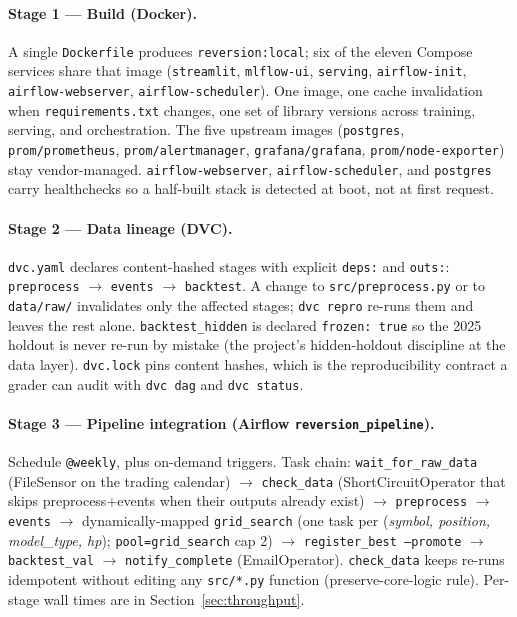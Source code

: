 \documentclass[11pt,a4paper]{article}
\begin{document}
\paragraph{Stage 1 --- Build (Docker).}
A single \texttt{Dockerfile} produces \texttt{reversion:local}; six of the eleven Compose services share that image (\texttt{streamlit}, \texttt{mlflow-ui}, \texttt{serving}, \texttt{airflow-init}, \texttt{airflow-webserver}, \texttt{airflow-scheduler}). One image, one cache invalidation when \texttt{requirements.txt} changes, one set of library versions across training, serving, and orchestration. The five upstream images (\texttt{postgres}, \texttt{prom/prometheus}, \texttt{prom/alertmanager}, \texttt{grafana/grafana}, \texttt{prom/node-exporter}) stay vendor-managed. \texttt{airflow-webserver}, \texttt{airflow-scheduler}, and \texttt{postgres} carry healthchecks so a half-built stack is detected at boot, not at first request.

\paragraph{Stage 2 --- Data lineage (DVC).}
\texttt{dvc.yaml} declares content-hashed stages with explicit \texttt{deps:} and \texttt{outs:}: \texttt{preprocess} $\to$ \texttt{events} $\to$ \texttt{backtest}. A change to \texttt{src/preprocess.py} or to \texttt{data/raw/} invalidates only the affected stages; \texttt{dvc repro} re-runs them and leaves the rest alone. \texttt{backtest\_hidden} is declared \texttt{frozen: true} so the 2025 holdout is never re-run by mistake (the project's hidden-holdout discipline at the data layer). \texttt{dvc.lock} pins content hashes, which is the reproducibility contract a grader can audit with \texttt{dvc dag} and \texttt{dvc status}.

\paragraph{Stage 3 --- Pipeline integration (Airflow \texttt{reversion\_pipeline}).}
Schedule \texttt{@weekly}, plus on-demand triggers. Task chain: \texttt{wait\_for\_raw\_data} (FileSensor on the trading calendar) $\to$ \texttt{check\_data} (ShortCircuitOperator that skips preprocess+events when their outputs already exist) $\to$ \texttt{preprocess} $\to$ \texttt{events} $\to$ dynamically-mapped \texttt{grid\_search} (one task per (\emph{symbol, position, model\_type, hp}); \texttt{pool=grid\_search} cap 2) $\to$ \texttt{register\_best --promote} $\to$ \texttt{backtest\_val} $\to$ \texttt{notify\_complete} (EmailOperator). \texttt{check\_data} keeps re-runs idempotent without editing any \texttt{src/*.py} function (preserve-core-logic rule). Per-stage wall times are in Section~\ref{sec:throughput}.
\end{document}
